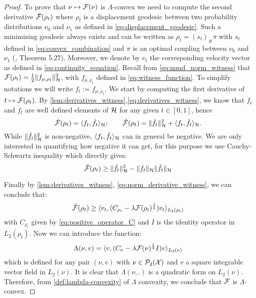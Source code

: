 \begin{proof}
To prove that $\nu\mapsto {{\mathcal F}}(\nu)$ is $\Lambda$-convex
we need to compute the second derivative $\ddot{{{\mathcal F}}}(\rho_{t})$
where $\rho_{t}$ is a displacement geodesic between two probability
distributions $\nu_{0}$ and $\nu_{1}$ as defined in \cref{eq:displacement_geodesic}. Such a minimizing geodesic always exists and can be written as $\rho_t = (s_t)_{\#}\pi$ with $s_t$ defined in \cref{eq:convex_combination} and $\pi$ is an optimal coupling between $\nu_0$ and $\nu_1$ (\cite{Santambrogio:2015}, Theorem 5.27). Moreover, we denote by $v_t$ the corresponding velocity vector as defined in \cref{eq:continuity_equation}. Recall from \cref{eq:mmd_norm_witness} that ${{\mathcal F}}(\rho_t) = \frac{1}{2} \Vert f_{\mu,\rho_t}\Vert^2_{\mathcal{H}}$, with $f_{\mu,\rho_t}$ defined in \cref{eq:witness_function}. To simplify notations we will write $f_t:= f_{\mu,\rho_t}$. We start by computing the first derivative of $ t\mapsto {{\mathcal F}}(\rho_t) $. By  \cref{lem:derivatives_witness},\cref{eq:derivatives_witness}, we know that $\dot{f}_t$ and $\ddot{f}_t $ are well defined elements of ${{\mathcal H}}$ for any given $t\in [0,1]$, hence 
\[
 \dot{{{\mathcal F}}}(\rho_t) = \langle f_t, \dot{f_t}\rangle_{{{\mathcal H}}};\qquad \ddot{{{\mathcal F}}}(\rho_t) = \Vert \dot{f_t}\Vert^2_{{{\mathcal H}}} + \langle f_t, \ddot{f_t}\rangle_{{{\mathcal H}}}.
 \]
While $\Vert \dot{f_t}\Vert^2_{{{\mathcal H}}}$ is non-negative, $\langle f_t, \ddot{f_t}\rangle_{{{\mathcal H}}}$ can in general be negative. We are only interested in quantifying how negative it can get, for this purpose we use Cauchy-Schwartz inequality which directly gives:
\[
\ddot{{{\mathcal F}}}(\rho_t)\geq  \Vert \dot{f}_t \Vert^2_{{{\mathcal H}}} - \Vert f_t \Vert_{{{\mathcal H}}}\Vert \ddot{f}_t\Vert_{{{\mathcal H}}} 
\]

Finally by \cref{lem:derivatives_witness}, \cref{eq:norm_derivative_witness}, we can conclude that:
\[
	\ddot{{{\mathcal F}}}(\rho_t)\geq  \langle v_t,(C_{\rho_t} - \lambda {{\mathcal F}}(\rho_t)^{\frac{1}{2}}) v_t \rangle_{L_2(\rho_t)} 
\]
with $C_{\rho_t}$ given by \cref{eq:positive_operator_C} and $I$ is the identity operator in $L_2(\rho_t)$. Now we can introduce the function:
\begin{align}
	\Lambda(\nu,v) = \langle v ,( C_{\nu} -\lambda {{\mathcal F}}(\nu)^{\frac{1}{2}} I) v \rangle_{L_2(\nu)} 
\end{align}
which is defined for any pair $(\nu,v)$ with  $\nu\in \mathcal{P}_2({{\mathcal X}})$ and $v$ a square integrable vector field in $L_2(\nu)$. It is clear that $\Lambda(\nu,.)$  is a quadratic form on $L_2(\nu)$. Therefore, from \cref{def:lambda-convexity} of $\Lambda$ convexity, we conclude that ${{\mathcal F}}$ is $\Lambda$-convex.
\end{proof}

